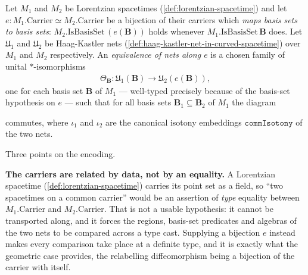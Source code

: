 \begin{definition}
    \label{def:net-equivalence-in-curved-spacetime}
    Let $M_1$ and $M_2$ be Lorentzian spacetimes (\ref{def:lorentzian-spacetime}) and let $e : M_1.\mathrm{Carrier} \simeq M_2.\mathrm{Carrier}$ be a bijection of their carriers which \emph{maps basis sets to basis sets}: $M_2.\mathrm{IsBasisSet}\,(e(\mathbf{B}))$ holds whenever $M_1.\mathrm{IsBasisSet}\,\mathbf{B}$ does. Let $\mathfrak{U}_1$ and $\mathfrak{U}_2$ be Haag-Kastler nets (\ref{def:haag-kastler-net-in-curved-spacetime}) over $M_1$ and $M_2$ respectively. An \emph{equivalence of nets along $e$} is a chosen family of unital $*$-isomorphisms
    \begin{align}
        \Theta_{\mathbf{B}} : \mathfrak{U}_1(\mathbf{B}) \longrightarrow \mathfrak{U}_2(e(\mathbf{B})),
    \end{align}
    one for each basis set $\mathbf{B}$ of $M_1$ --- well-typed precisely because of the basis-set hypothesis on $e$ --- such that for all basis sets $\mathbf{B}_1 \subseteq \mathbf{B}_2$ of $M_1$ the diagram

    \begin{center}
    \end{center}

    commutes, where $\iota_1$ and $\iota_2$ are the canonical isotony embeddings $\mathtt{commIsotony}$ of the two nets.

    Three points on the encoding.

    \textbf{The carriers are related by data, not by an equality.} A Lorentzian spacetime (\ref{def:lorentzian-spacetime}) carries its point set as a field, so ``two spacetimes on a common carrier'' would be an assertion of \emph{type} equality between $M_1.\mathrm{Carrier}$ and $M_2.\mathrm{Carrier}$. That is not a usable hypothesis: it cannot be transported along, and it forces the regions, basis-set predicates and algebras of the two nets to be compared across a type cast. Supplying a bijection $e$ instead makes every comparison take place at a definite type, and it is exactly what the geometric case provides, the relabelling diffeomorphism being a bijection of the carrier with itself.


\end{definition}

